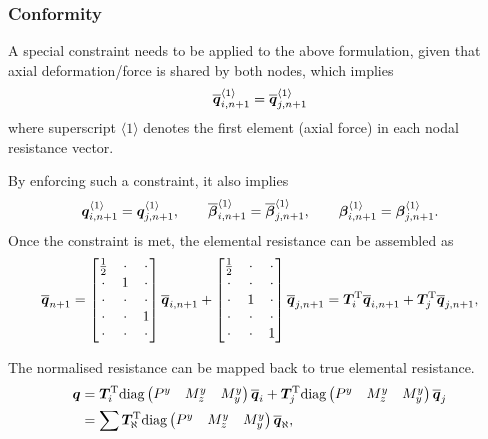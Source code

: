 \subsubsection{Conformity}
A special constraint needs to be applied to the above formulation, given that axial deformation/force is shared by both nodes, which implies
\begin{gather}
\bm{\overline{q}}_{i,n+1}^{\langle1\rangle}=\bm{\overline{q}}_{j,n+1}^{\langle1\rangle}
\end{gather}
where superscript $\langle1\rangle$ denotes the first element (axial force) in each nodal resistance vector.

By enforcing such a constraint, it also implies
\begin{gather}
\bm{q}_{i,n+1}^{\langle1\rangle}=\bm{q}_{j,n+1}^{\langle1\rangle},\qquad
\bm{\overline{\beta}}_{i,n+1}^{\langle1\rangle}=\bm{\overline{\beta}}_{j,n+1}^{\langle1\rangle},\qquad
\bm{\beta}_{i,n+1}^{\langle1\rangle}=\bm{\beta}_{j,n+1}^{\langle1\rangle}.
\end{gather}
Once the constraint is met, the elemental resistance can be assembled as
\begin{gather}
\bm{\overline{q}}_{n+1}=\begin{bmatrix}
\frac{1}{2}&\cdot&\cdot\\
\cdot&1&\cdot\\
\cdot&\cdot&\cdot\\
\cdot&\cdot&1\\
\cdot&\cdot&\cdot\\
\end{bmatrix}\bm{\overline{q}}_{i,n+1}+\begin{bmatrix}
\frac{1}{2}&\cdot&\cdot\\
\cdot&\cdot&\cdot\\
\cdot&1&\cdot\\
\cdot&\cdot&\cdot\\
\cdot&\cdot&1\\
\end{bmatrix}\bm{\overline{q}}_{j,n+1}=\bm{T}_i^{\mathrm{T}}\bm{\overline{q}}_{i,n+1}+\bm{T}_j^{\mathrm{T}}\bm{\overline{q}}_{j,n+1},
\end{gather}

The normalised resistance can be mapped back to true elemental resistance.
\begin{gather}
\begin{split}
\bm{q}&=\bm{T}_i^{\mathrm{T}}\text{diag}\left(\begin{matrix}
P^y&M_z^y&M_y^y
\end{matrix}\right)\bm{\overline{q}}_i+\bm{T}_j^{\mathrm{T}}\text{diag}\left(\begin{matrix}
P^y&M_z^y&M_y^y
\end{matrix}\right)\bm{\overline{q}}_j\\
&=\sum\bm{T}_\aleph^{\mathrm{T}}\text{diag}\left(\begin{matrix}
P^y&M_z^y&M_y^y
\end{matrix}\right)\bm{\overline{q}}_\aleph,
\end{split}
\end{gather}

